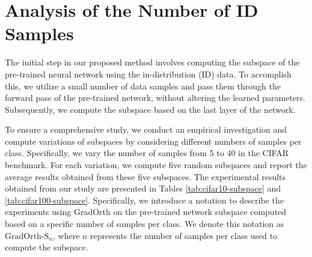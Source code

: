\documentclass{article}
\begin{document}
\section{Analysis of the Number of ID Samples}
\label{app:cifar-analysis}
The initial step in our proposed method involves computing the subspace of the pre-trained neural network using the in-distribution (ID) data. To accomplish this, we utilize a small number of data samples and pass them through the forward pass of the pre-trained network, without altering the learned parameters. Subsequently, we compute the subspace based on the last layer of the network.

To ensure a comprehensive study, we conduct an empirical investigation and compute variations of subspaces by considering different numbers of samples per class. Specifically, we vary the number of samples from 5 to 40 in the CIFAR benchmark. For each variation, we compute five random subspaces and report the average results obtained from these five subspaces. The experimental results obtained from our study are presented in Tables \ref{tab:cifar10-subspace} and \ref{tab:cifar100-subspace}. Specifically, we introduce a notation to describe the experiments using GradOrth on the pre-trained network subspace computed based on a specific number of samples per class. We denote this notation as $\text{GradOrth-S}_{n}$, where $n$ represents the number of samples per class used to compute the subspace.
\end{document}
